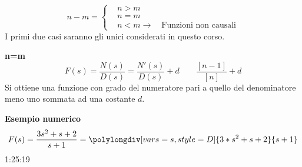 $$
n-m =
\left\{\begin{aligned}
&n>m\\
&n=m\\
&n<m  \rightarrow \quad \text{Funzioni non causali}
\end{aligned}\right.
$$
I primi due casi saranno gli unici considerati in questo corso.

\textbf{n=m}
$$
F(s) = \frac{N(s)}{D(s)} = \frac{N'(s)}{D(s)} + d\qquad \frac{[n-1]}{[n]} +d
$$
Si ottiene una funzione con grado del numeratore pari a quello del denominatore
meno uno sommata ad una costante $d$.

\textbf{Esempio numerico}
$$
F(s) =\frac{3s^2+s+2}{s+1}  = \polylongdiv[vars=s,style=D]{3*s^2+s+2}{s+1}
$$
1:25:19
